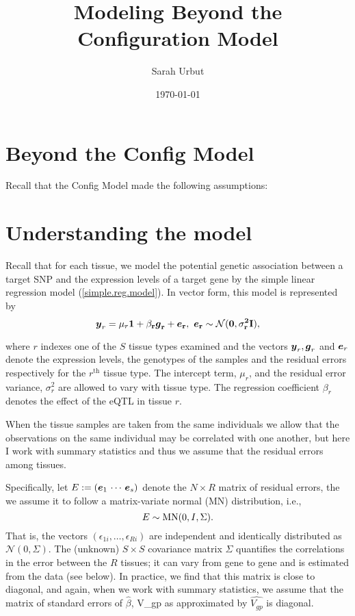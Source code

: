 \documentclass[10pt]{article}
\newcommand{\ev}{\mbox{\boldmath$e$}}
\newcommand{\gv}{\mbox{\boldmath$g$}}
\newcommand{\yv}{\mbox{\boldmath$y$}}
\newcommand{\lv}{\bf{1}}
\begin{document}
\title{Modeling Beyond the Configuration Model}
\author{Sarah Urbut}
\date{\today}

\maketitle

\tableofcontents

\vspace{1cm}

\section{Beyond the Config Model}

Recall that the Config Model made the following assumptions:

\section{Understanding the model}

Recall that for each tissue, we model the potential genetic association between a target SNP and the expression levels of a target gene by the simple linear regression model (\ref{simple.reg.model}). In vector form, this model is represented by
\begin{equation}
  \label{reg.model}
  \yv_r = \mu_r \lv + \beta_r \gv_r+ \ev_r,~\ev_r \sim \mathcal{N}(0,\sigma_r^2 I),
\end{equation}  

where $r$ indexes one of the $S$ tissue types examined and the vectors $\yv_r, \gv_r$ and $\ev_r$ denote the expression levels, the genotypes of the samples and the residual errors respectively for the $r^{\text{th}}$ tissue type.
The intercept term, $\mu_r$, and the residual error variance, $\sigma_r^2$ are allowed to vary with tissue type.
The regression coefficient $\beta_r$ denotes the effect of the eQTL in tissue $r$.

When the tissue samples are taken from the same individuals we allow that the observations on the same individual may be correlated with one another, but here I work with summary statistics and thus we assume that the residual errors among tissues.

Specifically, let $E := (\ev_1\,\cdots\,\ev_s)$  denote the $N \times R$ matrix of residual errors, the we assume it to follow a matrix-variate normal (MN) distribution, i.e.,
\begin{equation}
  E \sim {\rm MN}(0, I, \Sigma).
\end{equation}    
That is, the vectors $(\epsilon_{1i},\dots,\epsilon_{Ri})$ are independent and identically distributed as $\mathcal{N}(0, \Sigma)$.
The (unknown) $S \times S$ covariance matrix $\Sigma$ 
quantifies the correlations in the error between the $R$ tissues; it can vary from gene to gene and is estimated from the data (see below). In practice, we find that this matrix is close to diagonal, and again, when we work with summary statistics, we assume that the matrix of standard errors of $\hat\beta$, V_{gp} as approximated by $\hat{V_{gp}}$ is diagonal. 
\end{document}

